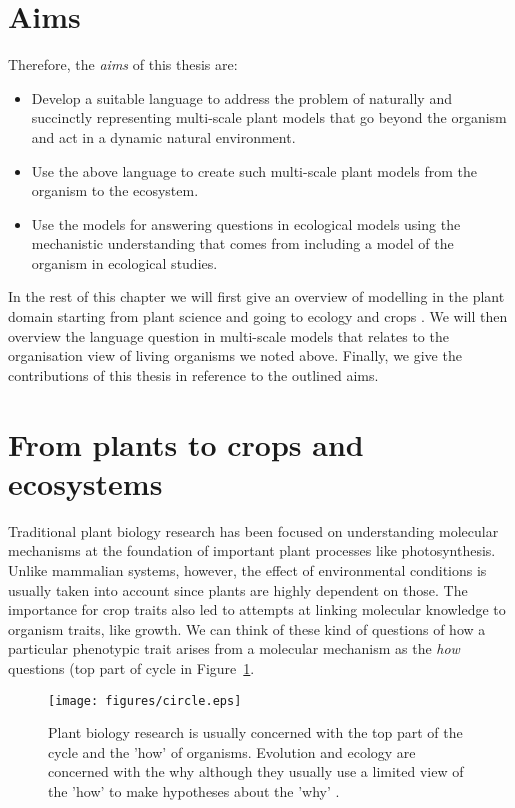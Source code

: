 \section{Aims}
\label{sec:aims}
Therefore, the \emph{aims} of this thesis are:
\begin{itemize}
\item Develop a suitable language to address the problem of naturally and
  succinctly representing multi-scale plant models that go beyond the organism
  and act in a dynamic natural environment.
\item Use the above language to create such multi-scale plant models from the
  organism to the ecosystem.
\item Use the models for answering questions in ecological models using the
  mechanistic understanding that comes from including a model of the organism in
  ecological studies.
\end{itemize}

In the rest of this chapter we will first give an overview of modelling in the
plant domain starting from plant science and going to ecology and crops . We
will then overview the language question in multi-scale models that relates to
the organisation view of living organisms we noted above. Finally, we give the
contributions of this thesis in reference to the outlined aims.

\section{From plants to crops and ecosystems}
Traditional plant biology research has been focused on understanding molecular
mechanisms at the foundation of important plant processes like
photosynthesis. Unlike mammalian systems, however, the effect of environmental
conditions is usually taken into account since plants are highly dependent on
those. The importance for crop traits also led to attempts at linking molecular
knowledge to organism traits, like growth. We can think of these kind of questions
of how a particular phenotypic trait arises from a molecular mechanism as the
\emph{how} questions (top part of cycle in Figure~\ref{fig:circle}.

\begin{figure}[tb]
  \centering
  \texttt{[image: figures/circle.eps]}
  \caption{Plant biology research is usually concerned with the top part of the
    cycle and the 'how' of organisms. Evolution and ecology are concerned with
    the why although they usually use a limited view of the 'how' to make
    hypotheses about the 'why' \citep{millar_intracellular_2016}.}
  \label{fig:circle}
\end{figure}

